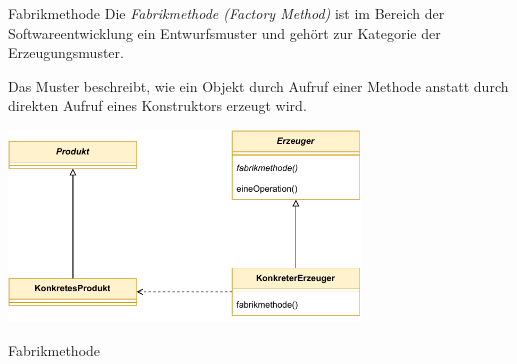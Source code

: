 \begin{defi}{Fabrikmethode}
    Die \emph{Fabrikmethode (Factory Method)} ist im Bereich der Softwareentwicklung ein Entwurfsmuster und gehört zur Kategorie der Erzeugungsmuster.

    Das Muster beschreibt, wie ein Objekt durch Aufruf einer Methode anstatt durch direkten Aufruf eines Konstruktors erzeugt wird.

    \begin{center}
        \includegraphics[width=0.7\textwidth]{includes/figures/defi_fabrikmethode.pdf}
    \end{center}
\end{defi}

\begin{example}{Fabrikmethode}

    

    

    
\end{example}

